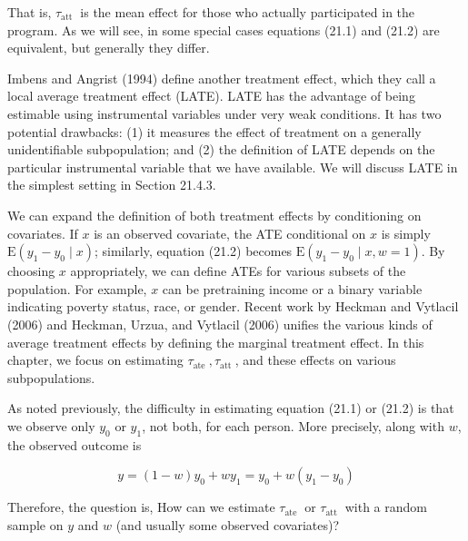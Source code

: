 \documentclass[10pt]{article}
\begin{document}
That is, $\tau_{\text {att }}$ is the mean effect for those who actually participated in the program. As we will see, in some special cases equations (21.1) and (21.2) are equivalent, but generally they differ.

Imbens and Angrist (1994) define another treatment effect, which they call a local average treatment effect (LATE). LATE has the advantage of being estimable using instrumental variables under very weak conditions. It has two potential drawbacks: (1) it measures the effect of treatment on a generally unidentifiable subpopulation; and (2) the definition of LATE depends on the particular instrumental variable that we have available. We will discuss LATE in the simplest setting in Section 21.4.3.

We can expand the definition of both treatment effects by conditioning on covariates. If $x$ is an observed covariate, the ATE conditional on $x$ is simply $\mathrm{E}\left(y_{1}-y_{0} \mid x\right)$; similarly, equation (21.2) becomes $\mathrm{E}\left(y_{1}-y_{0} \mid x, w=1\right)$. By choosing $x$ appropriately, we can define ATEs for various subsets of the population. For example, $x$ can be pretraining income or a binary variable indicating poverty status, race, or gender. Recent work by Heckman and Vytlacil (2006) and Heckman, Urzua, and Vytlacil (2006) unifies the various kinds of average treatment effects by defining the marginal treatment effect. In this chapter, we focus on estimating $\tau_{\text {ate }}, \tau_{\text {att }}$, and these effects on various subpopulations.

As noted previously, the difficulty in estimating equation (21.1) or (21.2) is that we observe only $y_{0}$ or $y_{1}$, not both, for each person. More precisely, along with $w$, the observed outcome is


\begin{equation*}
y=(1-w) y_{0}+w y_{1}=y_{0}+w\left(y_{1}-y_{0}\right) \tag{21.3}
\end{equation*}


Therefore, the question is, How can we estimate $\tau_{\text {ate }}$ or $\tau_{\text {att }}$ with a random sample on $y$ and $w$ (and usually some observed covariates)?
\end{document}
